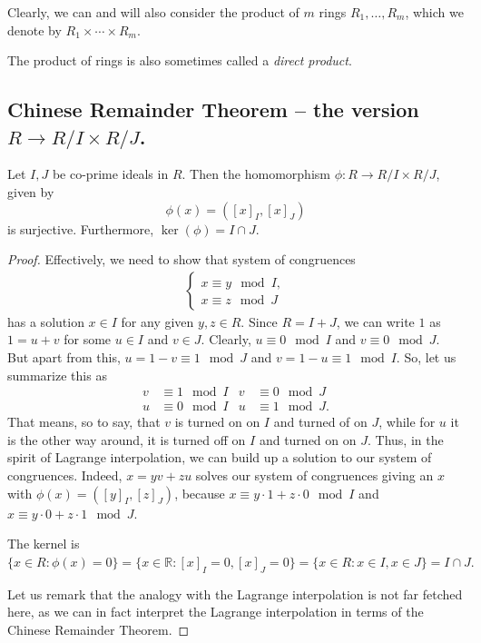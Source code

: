 \documentclass[11pt,a4paper]{amsart}
\newcommand{\R}{{\mathbb{R}}}
\begin{document}
Clearly, we can and will also consider the product of $m$ rings $R_1, \ldots, R_m$, which we denote by $R_1 \times \cdots \times R_m$.

The product of rings is also sometimes called a \emph{direct product}. 

\subsection{Chinese Remainder Theorem -- the version $R \to R / I \times R / J$.} Let $I,J$ be co-prime ideals in $R$. Then the homomorphism $\phi : R \to R / I \times R / J$, given by 
\[
	\phi(x) = ( [x]_I, [x]_J)
\] is surjective. Furthermore, $\ker(\phi) = I \cap J$. 
\begin{proof} 
	Effectively, we need to show that system of congruences
	\begin{align*} 
			\begin{cases} 
					x \equiv y \mod I,
					\\ 
					x \equiv z \mod J
			\end{cases} 
	\end{align*} 
	has a solution $x \in I$ for any given $y, z \in R$. Since $R = I+J$, we can write $1$ as $1 = u + v$ for some $u \in I$ and $v \in J$. Clearly, $u \equiv 0 \mod I$ and $v \equiv 0 \mod J$. But apart from this, $u = 1 - v \equiv 1 \mod J$ and $v = 1 -u \equiv 1 \mod I$. So, let us summarize this as 
	\begin{align*}
			v& \equiv 1 \mod I  & v & \equiv 0 \mod J
			\\ 
			u & \equiv 0 \mod I  & u & \equiv 1 \mod J. 
	\end{align*} 
That means, so to say, that $v$ is turned on on $I$ and turned of on $J$, while for $u$ it is the other way around, it is turned off on $I$ and turned on on $J$. Thus, in the spirit of Lagrange interpolation, we can build up a solution to our system of congruences. Indeed, $x = y v + z u$ solves our system of congruences giving an $x$ with $\phi(x) = ( [y]_I, [z]_J)$, 
because $x \equiv y \cdot 1 + z \cdot 0 \mod I$ and $x \equiv y \cdot 0 + z \cdot 1 \mod J$. 
	
	The kernel is $\{ x \in R \colon \phi(x) = 0\} = \{ x \in \R \colon [x]_I = 0, [x]_J = 0\} = \{x \in R \colon x \in I , x \in J\} = I \cap J.$
	
	Let us remark that the analogy with the Lagrange interpolation is not far fetched here, as we can in fact interpret the Lagrange interpolation in terms of the Chinese Remainder Theorem. 
\end{proof} 
\end{document}
